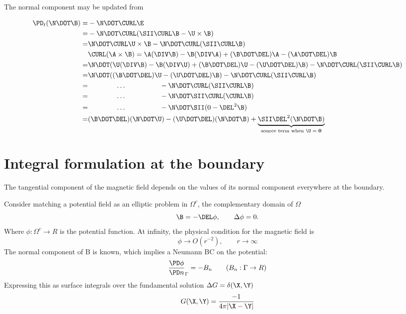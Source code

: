 \documentclass[11pt]{article}
\begin{document}
The normal component may be updated from

\begin{equation}\begin{aligned}
  \PD_t (\N \DOT \B) =& - \N \DOT \CURL \E \\
   =& - \N \DOT \CURL (\SII \CURL \B - \U \times \B) \\
   =& \N \DOT \CURL \U \times \B - \N \DOT \CURL (\SII \CURL \B) \\
  & \CURL (\A \times \B) = \A (\DIV \B) - \B (\DIV \A) + (\B \DOT \DEL)\A - (\A \DOT \DEL)\B \\
   =& \N \DOT (\U (\DIV \B) - \B (\DIV \U) + (\B \DOT \DEL)\U - (\U \DOT \DEL)\B) - \N \DOT \CURL (\SII \CURL \B) \\
   =& \N \DOT ((\B \DOT \DEL)\U - (\U \DOT \DEL)\B) - \N \DOT \CURL (\SII \CURL \B) \\
   =& \qquad \qquad \hdots \qquad \qquad \quad  - \N \DOT \CURL (\SII \CURL \B) \\
   =& \qquad \qquad \hdots \qquad \qquad \quad  - \N \DOT \SII \CURL (\CURL \B) \\
   =& \qquad \qquad \hdots \qquad \qquad \quad  - \N \DOT \SII (0 - \DEL^2 \B) \\
   =& (\B \DOT \DEL)(\N \DOT \U) - (\U \DOT \DEL)(\N \DOT \B) + \underbrace{\SII \DEL^2 (\N \DOT \B)}_{\text{source term when $\U=\mathbf{0}$}} \\
\end{aligned}\end{equation}

\section{Integral formulation at the boundary}
The tangential component of the magnetic field depends on the values of its normal component everywhere at the boundary.

Consider matching a potential field as an elliptic problem in $\Omega^c$, the complementary domain of $\Omega$
\begin{equation}
  \B = -\DEL \phi, \qquad \Delta \phi = 0.
\end{equation}
Where $\phi: \Omega^c \rightarrow R$ is the potential function. At infinity, the physical condition for the magnetic field is
\begin{equation}
  \phi \rightarrow O(r^{-2}), \qquad r \rightarrow \infty
\end{equation}
The normal component of B is known, which implies a Neumann BC on the potential:
\begin{equation}
  \frac{\PD \phi}{\PD n}_{\Gamma} = - B_n \qquad (B_n: \Gamma \rightarrow R)
\end{equation}
Expressing this as surface integrals over the fundamental solution $\Delta G = \delta(\X,\Y)$
\begin{equation}
  G(\X,\Y) = \frac{-1}{4 \pi |\X-\Y|}
\end{equation}
\end{document}

